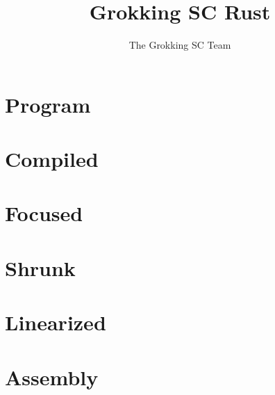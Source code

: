 \documentclass[12pt]{article}
\title{Grokking SC Rust}
\author{The Grokking SC Team}
\begin{document}
\maketitle
\section{Program}


\section{Compiled}



\section{Focused}


\section{Shrunk}



\section{Linearized}



\section{Assembly}


\end{document}
